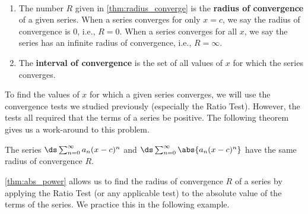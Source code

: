 \begin{definition}\label{def:radius_converge}
\mbox{}\\[-2\baselineskip]
\begin{enumerate}
	\item The number $R$ given in \autoref{thm:radius_converge} is the \textbf{radius of convergence} of a given series. When a series converges for only $x=c$, we say the radius of convergence is 0, i.e.,  $R=0$. When a series converges for all $x$, we say the series has an infinite radius of convergence, i.e., $R=\infty$.
	\item	The \textbf{interval of convergence} is the set of all values of $x$ for which the series converges.
\end{enumerate}
\end{definition}

To find the values of $x$ for which a given series converges, we will use the convergence tests we studied previously (especially the Ratio Test). However, the tests all required that the terms of a series be positive. The following theorem gives us a work-around to this problem.

\begin{theorem}\label{thm:abs_power}
	The series $\ds \sum_{n=0}^\infty a_n(x-c)^n$ and $\ds \sum_{n=0}^\infty \abs{a_n(x-c)^n}$ have the same radius of convergence $R$.
\end{theorem}

\autoref{thm:abs_power} allows us to find the radius of convergence $R$ of a series by applying the Ratio Test (or any applicable test) to the absolute value of the terms of the series. We practice this in the following example.


